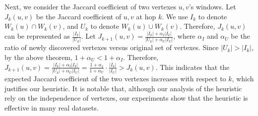 Next, we consider the Jaccard coefficient of two vertexes $u,v$'s windows. Let $J_k(u,v)$ be the 
Jaccard coefficient of $u,v$ at hop $k$. We use $I_k$ to denote $W_k(u) \cap W_k(v)$, and $U_k$ to denote
$W_k(u) \cup W_k(v)$. Therefore, $J_k(u,v)$ can be represented as $\frac{|I_k|}{|U_k|}$. Let
$J_{k+1}(u,v) =\frac{|I_k| + \alpha_I|I_k|}{|U_k|+ \alpha_U|I_U|}$, where $\alpha_I$ and $\alpha_U$ 
be the ratio of newly discovered vertexes versus original set of vertexes.
Since $|U_k| > |I_k|$, by the above theorem, $1+\alpha_U < 1+\alpha_I$. Therefore, $J_{k+1}(u,v)=\frac{|I_k| + \alpha_I|I_k|}{|U_k|+ \alpha_U|I_U|}= \frac{1+\alpha_I}{1+\alpha_U}\cdot\frac{|I_k|}{|I_U|} > J_k(u,v)$. This indicates that
the expected Jaccard coefficient of the two vertexes increases with respect to $k$, which justifies
our heuristic. 
It is notable that, although our analysis of the heuristic rely on the independence of vertexes,
our experiments show that the heuristic is effective in many real datasets.

